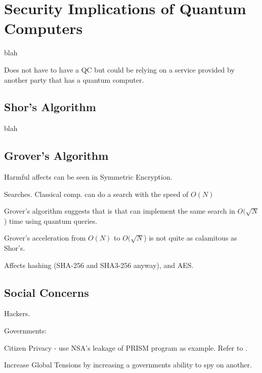 \section{Security Implications of Quantum Computers}
blah

Does not have to have a QC but could be relying on a service provided by another party that has a quantum computer.

\subsection{Shor's Algorithm}
blah

\subsection{Grover's Algorithm}



Harmful affects can be seen in Symmetric Encryption.

Searches.
Classical comp. can do a search with the speed of \(O(N)\)

Grover's algorithm suggests that is that can implement the same search in \(O(\sqrt{N}\)) time using quantum queries.

Grover's acceleration from \(O(N)\) to \(O(\sqrt{N}\)) is not quite as calamitous as Shor's.

Affects hashing (SHA-256 and SHA3-256 anyway), and AES.

\subsection{Social Concerns}
Hackers.

Governments:

Citizen Privacy - use NSA's leakage of PRISM program as example. Refer to \cite{Sec_Risk}.
    
Increase Global Tensions by increasing a governments ability to spy on another. 

    